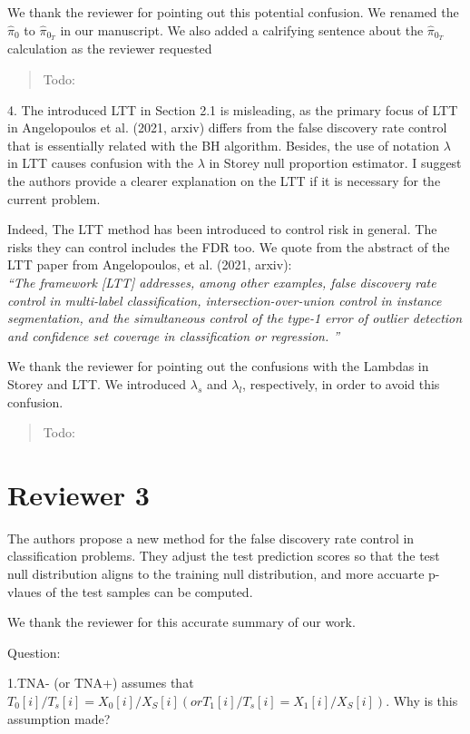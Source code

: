 \documentclass{article}
\newcommand{\response}[1]{\vspace*{1ex} \color{blue} \noindent #1 \color{black}
\vspace*{2ex}}
\newcommand{\edit}[1]{\begin{quotation}\color{red}\noindent #1
\color{black}\end{quotation}}
\begin{document}
\response{We thank the reviewer for pointing out this potential confusion. We renamed the  $\hat{\pi}_0$ to $\hat{\pi}_{0_{T}}$ in our manuscript. We also added a calrifying sentence about the $\hat{\pi}_{0_{T}}$ calculation as the reviewer requested}

\edit{Todo:}

4. The introduced LTT in Section 2.1 is misleading, as the primary focus of LTT in Angelopoulos et al. (2021, arxiv) differs from the false discovery rate control that is essentially related with the BH algorithm.
Besides, the use of notation $\lambda$ in LTT causes confusion with the $\lambda$ in Storey null proportion estimator.
I suggest the authors provide a clearer explanation on the LTT if it is necessary for the current problem.

\response{Indeed, The LTT method has been introduced to control risk in general. The risks they can control includes the FDR too. We quote from the abstract of the LTT paper from Angelopoulos, et al. (2021, arxiv):\\
{\em ``The framework [LTT] addresses, among other examples, false discovery rate control in multi-label classification, intersection-over-union control in instance segmentation, and the simultaneous control of the type-1 error of outlier detection and confidence set coverage in classification or regression. ''}}

\response{We thank the reviewer for pointing out the confusions with the Lambdas in Storey and LTT. We introduced $\lambda_s$ and $\lambda_l$, respectively, in order to avoid this confusion.}

\edit{Todo:}

\section*{Reviewer 3}

The authors propose a new method for the false discovery rate control in classification problems. They adjust the test prediction scores so that the test null distribution
aligns to the training null distribution, and more accuarte p-vlaues of the test samples can be computed.

\response{We thank the reviewer for this accurate summary of our work.}

Question:

1.TNA- (or TNA+) assumes that $T_0[i]/T_s[i]= X_0[i]/X_S[i] (or T_1[i]/T_s[i]= X_1[i]/X_S[i] )$. Why is this assumption made? 
\end{document}
